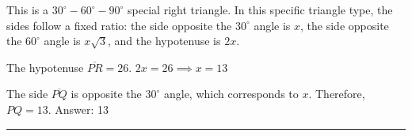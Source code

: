 \documentclass[11pt,paper=a4,answers]{exam}
\begin{document}
\begin{questions}
\begin{solution}
This is a $30^\circ-60^\circ-90^\circ$ special right triangle. In this specific triangle type, the sides follow a fixed ratio: the side opposite the $30^\circ$ angle is $x$, the side opposite the $60^\circ$ angle is $x\sqrt{3}$, and the hypotenuse is $2x$.
\vspace{5pt}
\begin{center}
The hypotenuse $\overline{PR} = 26$.
\vspace{5pt}
$2x = 26 \implies x = 13$
\end{center}
\vspace{5pt}
The side $\overline{PQ}$ is opposite the $30^\circ$ angle, which corresponds to $x$.
\vspace{5pt}
Therefore, $PQ = 13$.
\vspace{5pt}
Answer: \colorbox{yellow!100}{13}
\end{solution}



\end{questions}
\begin{center}
\rule{.5\textwidth}{1pt}
\end{center}
\end{document}
